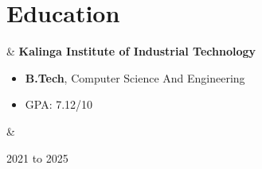 \documentclass[10pt, letterpaper]{article}
\newenvironment{highlights}{
        \begin{itemize}[
                topsep=0pt,
                parsep=0.10 cm,
                partopsep=0pt,
                itemsep=0pt,
                after=\vspace{-1\baselineskip},
                leftmargin=0.4 cm + 3pt
            ]
    }{
        \end{itemize}
    } %
\let\originalTabularx\tabularx
\let\originalEndTabularx\endtabularx
\renewenvironment{tabularx}{\bgroup\centering\originalTabularx}{\originalEndTabularx\par\egroup}
\begin{document}
    
    \section{Education}

        \begin{tabularx}{
            \textwidth-0.4 cm-0.13cm
        }{
            L{0.85cm}
            K{0.2 cm}
            R{4.1 cm}
        }
            \textbf{}
            &
            \textbf{Kalinga Institute of Industrial Technology}

            \vspace{0.10 cm}

            \begin{highlights}
                \item \textbf{B.Tech}, Computer Science And Engineering
                \item GPA: 7.12/10 
             
            \end{highlights}
            &
            

            2021 to 2025
        \end{tabularx}


    



                \item %




    
\end{document}
